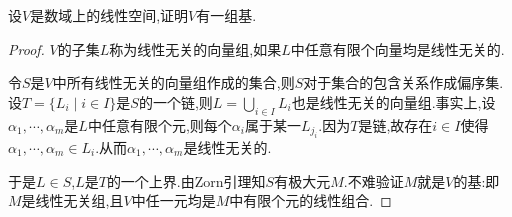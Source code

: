 \documentclass[../../main.tex]{subfiles}%
\begin{document}
\begin{proposition}
设$V$是数域上的线性空间,证明$V$有一组基.
\end{proposition}
\begin{proof}
$V$的子集$L$称为线性无关的向量组,如果$L$中任意有限个向量均是线性无关的.

令$S$是$V$中所有线性无关的向量组作成的集合,则$S$对于集合的包含关系作成偏序集.设$T=\{L_i \mid i \in I\}$是$S$的一个链,则$L=\bigcup_{i \in I} L_i$也是线性无关的向量组.事实上,设$\alpha_1,\cdots,\alpha_m$是$L$中任意有限个元,则每个$\alpha_i$属于某一$L_{j_i}$.因为$T$是链,故存在$i \in I$使得$\alpha_1,\cdots,\alpha_m \in L_i$.从而$\alpha_1,\cdots,\alpha_m$是线性无关的.

于是$L \in S$,$L$是$T$的一个上界.由Zorn引理知$S$有极大元$M$.不难验证$M$就是$V$的基:即$M$是线性无关组,且$V$中任一元均是$M$中有限个元的线性组合.
\end{proof}
\end{document}
